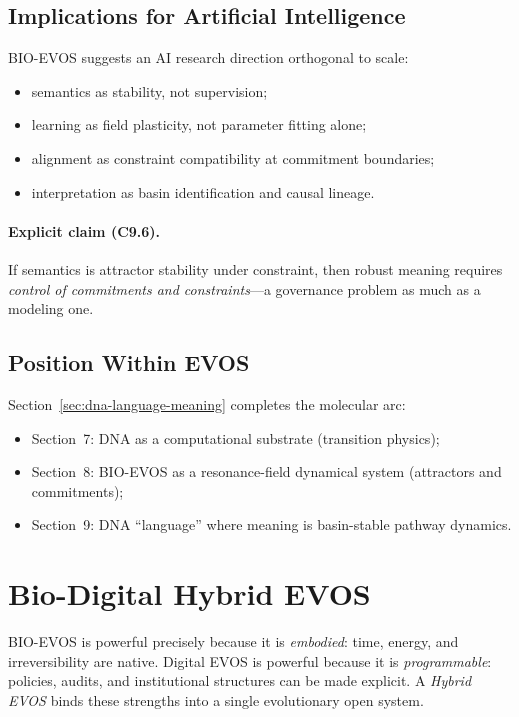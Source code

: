 \documentclass[11pt]{article}
\begin{document}
\subsection{Implications for Artificial Intelligence}
\label{sec:implications-ai}

BIO-EVOS suggests an AI research direction orthogonal to scale:
\begin{itemize}
  \item semantics as stability, not supervision;
  \item learning as field plasticity, not parameter fitting alone;
  \item alignment as constraint compatibility at commitment boundaries;
  \item interpretation as basin identification and causal lineage.
\end{itemize}

\paragraph{Explicit claim (C9.6).}
If semantics is attractor stability under constraint, then robust meaning requires
\emph{control of commitments and constraints}---a governance problem as much as a modeling one.

\subsection{Position Within EVOS}
\label{sec:position-within-evos-9}

Section~\ref{sec:dna-language-meaning} completes the molecular arc:
\begin{itemize}
  \item Section~7: DNA as a computational substrate (transition physics);
  \item Section~8: BIO-EVOS as a resonance-field dynamical system (attractors and commitments);
  \item Section~9: DNA ``language'' where meaning is basin-stable pathway dynamics.
\end{itemize}

\section{Bio-Digital Hybrid EVOS}
\label{sec:hybrid-evos}

BIO-EVOS is powerful precisely because it is \emph{embodied}: time, energy, and
irreversibility are native. Digital EVOS is powerful because it is \emph{programmable}:
policies, audits, and institutional structures can be made explicit. A \emph{Hybrid EVOS}
binds these strengths into a single evolutionary open system.
\end{document}
